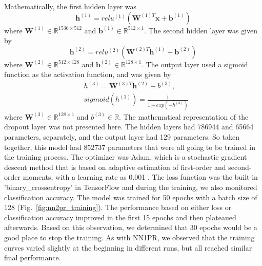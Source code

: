 \documentclass{article}
\begin{document}
Mathematically, the first hidden layer was
$$\bm{h}^{(1)} = relu^{(1)}(\bm{W}^{(1)T}\bm{x} + \bm{b}^{(1)})$$
where $\bm{W}^{(1)} \in \mathbb{R}^{1536\times 512}$ and $\bm{b}^{(1)} \in \mathbb{R}^{512\times 1}$.
The second hidden layer was given by 
$$\bm{h}^{(2)} = relu^{(2)}(\bm{W}^{(2)T}\bm{h}^{(1)} + \bm{b}^{(2)})$$
where $\bm{W}^{(2)} \in \mathbb{R}^{512\times 128}$ and $\bm{b}^{(2)} \in \mathbb{R}^{128\times 1}$.
The output layer used a sigmoid function as the activation function, and was given by 
\begin{align*}
    &{h}^{(3)} = \bm{W}^{(3)T}\bm{h}^{(2)} + {b}^{(3)},  \\
    &sigmoid(h^{(3)}) = \frac{1}{1 + exp(-h^{(3)})}
\end{align*}
where $\bm{W}^{(3)} \in \mathbb{R}^{128\times 1}$ and ${b}^{(3)} \in \mathbb{R}$.
The mathematical representation of the dropout layer was not presented here. 
The hidden layers had 786944 and 65664 parameters, separately, and the output layer had 129 parameters. 
So taken together, this model had $852737$ parameters that were all going to be trained in the training process. 
The optimizer was Adam, which is a stochastic gradient descent method that is based on adaptive estimation of first-order and second-order moments, with a learning rate as 0.001 \citep{kingma2014adam}.
The loss function was the built-in 'binary\_crossentropy' in TensorFlow and during the training, we also monitored classification accuracy. 
The model was trained for 50 epochs with a batch size of 128 (Fig.~\ref{fig:nn2pr_training}). 
The performance based on either loss or classification accuracy improved in the first 15 epochs and then plateaued afterwards. 
Based on this observation, we determined that 30 epochs would be a good place to stop the training.
As with NN1PR, we observed that the training curves varied slightly at the beginning in different runs, but all reached similar final performance.
\end{document}
